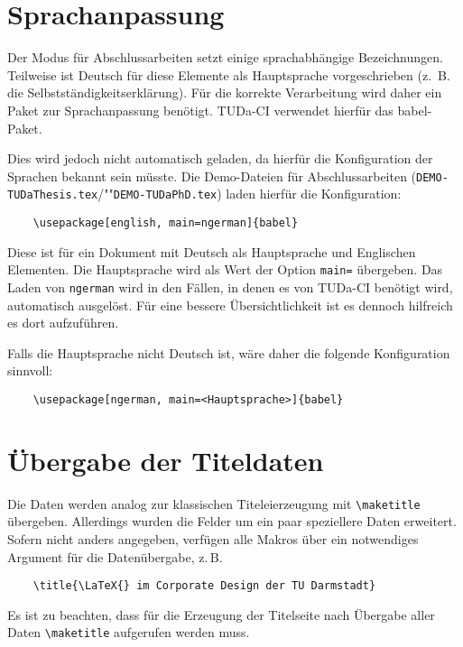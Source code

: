 \documentclass[
	german,%
	ruledheaders=section,%
	class=report,%
	thesis={type=bachelor},%
	fontsize=11pt,%
	parskip=half-,%
	custommargins=true,%
	marginpar=false,%
	accentcolor=9c,%
]{tudapub}
\let\file\texttt
\begin{document}
\section{Sprachanpassung}
Der Modus für Abschlussarbeiten setzt einige sprachabhängige Bezeichnungen.
Teilweise ist Deutsch für diese Elemente als Hauptsprache vorgeschrieben (z.
\,B. die Selbstständigkeitserklärung).
Für die korrekte Verarbeitung wird daher ein Paket zur Sprachanpassung benötigt.
TUDa-CI verwendet hierfür das babel-Paket.

Dies wird jedoch nicht automatisch geladen, da hierfür die Konfiguration der Sprachen bekannt sein müsste.
Die Demo-Dateien für Abschlussarbeiten (\file{DEMO-TUDaThesis.tex}/""\file{DEMO-TUDaPhD.tex}) laden hierfür die Konfiguration:
\begin{verbatim}
    \usepackage[english, main=ngerman]{babel}
\end{verbatim}
Diese ist für ein Dokument mit Deutsch als Hauptsprache und Englischen Elementen.
Die Hauptsprache wird als Wert der Option \verb+main=+ übergeben.
Das Laden von \verb+ngerman+ wird in den Fällen, in denen es von TUDa-CI benötigt wird, automatisch ausgelöst.
Für eine bessere Übersichtlichkeit ist es dennoch hilfreich es dort aufzuführen.

Falls die Hauptsprache nicht Deutsch ist, wäre daher die folgende Konfiguration sinnvoll:
\begin{verbatim}
    \usepackage[ngerman, main=<Hauptsprache>]{babel}
\end{verbatim}

\section{Übergabe der Titeldaten}

Die Daten werden analog zur klassischen Titeleierzeugung mit \verb+\maketitle+ übergeben.
Allerdings wurden die Felder um ein paar speziellere Daten erweitert.
Sofern nicht anders angegeben, verfügen alle Makros über ein notwendiges Argument für die Datenübergabe, z.\,B.
\begin{verbatim}
    \title{\LaTeX{} im Corporate Design der TU Darmstadt}
\end{verbatim}
Es ist zu beachten, dass für die Erzeugung der Titelseite nach Übergabe aller Daten \verb+\maketitle+ aufgerufen werden muss.
\end{document}
